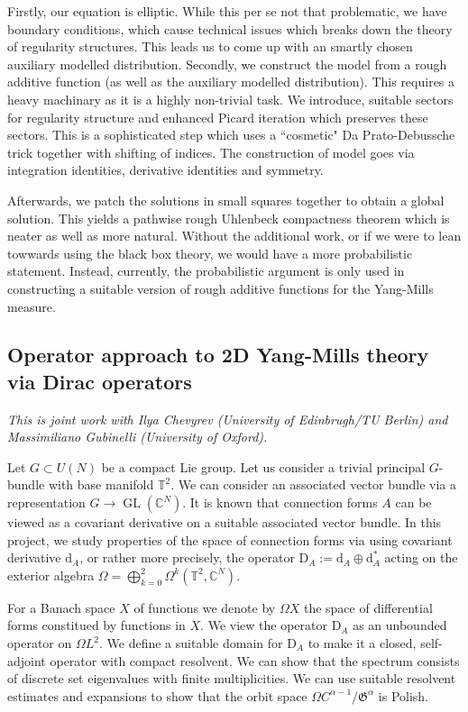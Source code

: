 \documentclass[12pt]{article}
\numberwithin{equation}{section}
\theoremstyle{definition}
\theoremstyle{remark}
\newcommand{\diff}{\mathrm{d}}
\newcommand{\1}{\mathbf 1}
\newcommand{\<}{\langle}
\renewcommand{\>}{\rangle}
\newcommand{\rmD}{\mathrm{D}}
\newcommand{\bT}{\mathbb T}
\begin{document}
Firstly, our equation is elliptic. While this per se not that problematic, we have boundary conditions, which cause technical issues which breaks down the theory of regularity structures. This leads us to come up with an smartly chosen auxiliary modelled distribution.  Secondly, we construct the model from a rough additive function (as well as the auxiliary modelled distribution). This requires a heavy machinary as it is a highly non-trivial task. We introduce, suitable sectors for regularity structure and enhanced Picard iteration which preserves these sectors. This is a sophisticated step which uses a ``cosmetic" Da Prato-Debussche trick together with shifting of indices.   The construction of model goes via integration identities, derivative identities and symmetry.  

Afterwards, we patch the solutions in small squares together to obtain a global solution. This yields a pathwise rough Uhlenbeck compactness theorem which is neater as well as more natural. Without the additional work, or if we were to lean towwards using the black box theory, we would have a more probabilistic statement. Instead, currently, the probabilistic argument  is only used in constructing a suitable version of rough additive functions for the Yang-Mills measure. 
%




\subsection{Operator approach to 2D Yang-Mills theory via Dirac operators}\label{sec:Dirac_2D}
%
\textit{This is joint work with Ilya Chevyrev (University of Edinbrugh/TU Berlin) and Massimiliano Gubinelli (University of Oxford).} 

\medskip 

\noindent Let $G\subset U(N)$ be a compact Lie group. Let us consider a trivial principal $G$-bundle with base manifold $\bT^2$. We can consider an associated vector bundle via a representation $G\to \operatorname{GL}(\mathbb C^N)$. It is known that connection forms $A$ can be viewed as a covariant derivative on a suitable associated vector bundle. In this project, we study properties of the space of connection forms via using covariant derivative $\diff_A$, or rather more precisely, the operator  $\mathrm{D}_A:=\diff_A\oplus\diff_A^*$ acting on the exterior algebra $\Omega=\bigoplus_{k=0}^ 2\Omega^k(\bT^2,\mathbb C^N)$. 

For a Banach space $X$ of functions we denote by $\Omega X$ the space of differential forms constitued by functions in $X$. We view the operator $\rmD_A$ as an unbounded operator on $\Omega L^2$. We define a suitable domain for $\rmD_A$ to make it a closed, self-adjoint operator with compact resolvent. We can show that the spectrum consists of discrete set eigenvalues with finite multiplicities. We can use suitable resolvent estimates and expansions to show that the orbit space $\Omega C^{\alpha-1}/\mathfrak G^\alpha$ is Polish.
\end{document}
